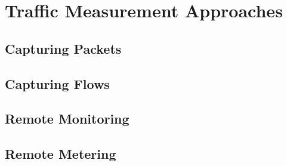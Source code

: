 \chapter{Traffic Measurement Approaches}\label{ch:traffic-measurement-approaches}

\section{Capturing Packets}\label{sec:capturing-packets}
\section{Capturing Flows}\label{sec:capturing-flows}
\section{Remote Monitoring}\label{sec:remote-monitoring}
\section{Remote Metering}\label{sec:remote-metering}